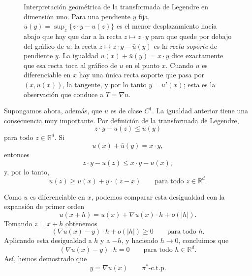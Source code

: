 \documentclass[12pt, a4paper]{amsbook}
\theoremstyle{remark}
\theoremstyle{definition}
\numberwithin{section}{chapter}
\numberwithin{subsection}{section}
\numberwithin{equation}{section}
\numberwithin{figure}{chapter}
\begin{document}
\begin{figure}[ht]
\centering
{}
\caption{Interpretación geométrica de la transformada de Legendre en
dimensión uno. Para una pendiente $y$ fija, $\bar u(y)=\sup_z\{z\cdot y-u(z)\}$
es el menor desplazamiento hacia abajo que hay que dar a la recta
$z\mapsto z\cdot y$ para que quede por debajo del gráfico de $u$: la recta
$z\mapsto z\cdot y-\bar u(y)$ es la \emph{recta soporte} de pendiente
$y$. La igualdad $u(x)+\bar u(y)=x\cdot y$ dice exactamente que esa recta toca
al gráfico de $u$ en el punto $x$. Cuando $u$ es diferenciable en $x$ hay una
única recta soporte que pasa por $(x,u(x))$, la tangente, y por lo tanto
$y=u'(x)$; esta es la observación que conduce a $T=\nabla u$.}
\label{fig.legendre}
\end{figure}
 
Supongamos ahora, además, que $u$ es de clase $C^1$. La igualdad anterior
tiene una consecuencia muy importante. Por definición de la transformada
de Legendre,
\[
z\cdot y-u(z)\leq \bar u(y)
\]
para todo $z\in\mathbb R^d$. Si
\[
u(x)+\bar u(y)=x\cdot y,
\]
entonces
\[
z\cdot y-u(z)\leq x\cdot y-u(x),
\]
y, por lo tanto,
\[
u(z)\geq u(x)+y\cdot(z-x)
\qquad\text{para todo }z\in\mathbb R^d.
\]

Como $u$ es diferenciable en $x$, podemos comparar esta desigualdad con la
expansión de primer orden
\[
u(x+h)=u(x)+\nabla u(x)\cdot h+o(|h|).
\]
Tomando $z=x+h$ obtenemos
\[
(\nabla u(x)-y)\cdot h+o(|h|)\geq0
\qquad\text{para todo }h.
\]
Aplicando esta desigualdad a $h$ y a $-h$, y haciendo $h\to0$, concluimos
que
\[
(\nabla u(x)-y)\cdot h=0
\qquad\text{para todo }h\in\mathbb R^d.
\]
Así, hemos demostrado que
\[
y=\nabla u(x)
\qquad
\pi^*\text{-c.t.p.}
\]
\end{document}
